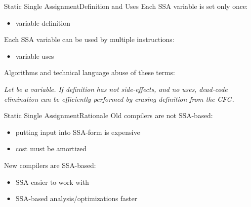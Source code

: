 \documentclass[10pt,mathserif]{beamer}
\begin{document}
\begin{frame}{Static Single Assignment}{Definition and Uses}
Each SSA variable is set only once:

\begin{itemize}
\item variable \alert{definition}
\end{itemize}

\vfill
Each SSA variable can be used by multiple instructions:

\begin{itemize}
\item variable \alert{uses}
\end{itemize}

\vfill
Algorithms and technical language abuse of these terms:

\vfill
\emph{
Let  be a variable. If  definition has not
side-effects, and no uses, dead-code elimination can be efficiently performed
by erasing  definition from the CFG.
}
\end{frame}

\begin{frame}{Static Single Assignment}{Rationale}
Old compilers are not SSA-based:

\begin{itemize}
\item putting input into SSA-form is expensive
\item cost must be amortized
\end{itemize}

\vfill
New compilers are SSA-based:

\begin{itemize}
\item SSA easier to work with
\item SSA-based analysis/optimizations faster
\end{itemize}

\vfill
%
\end{frame}
\end{document}
